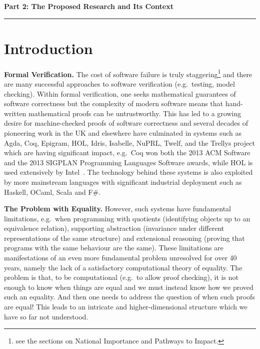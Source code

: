 \documentclass[a4paper,11pt]{article}
\newcommand{\eg}{{e.g.}\ }
\begin{document}
\newpage
\noindent
{\bf \Large Part 2: The Proposed Research and Its Context}

\vspace*{-0.23in}

\begin{center}
\rule{170mm}{.5mm}
\end{center}

\vspace*{-0.4in}

\section{Introduction}\label{sec:intro}

\vspace*{-0.1in}

{\bf Formal Verification.} The cost of software failure is truly
staggering\footnote{see the sections on National Importance and
  Pathways to Impact.} and there are many successful approaches to
software verification (\eg testing, model checking). Within formal
verification, one seeks mathematical guarantees of software correctness but
the complexity of modern software means that hand-written mathematical
proofs can be untrustworthy. This has led to a growing desire for
machine-checked proofs of software correctness and several decades of
pioneering work in the UK and elsewhere have culminated in systems
such as Agda, Coq, Epigram, HOL, Idris, Isabelle, NuPRL, Twelf, and
the Trellys project which are having significant impact, \eg Coq won
both the 2013 ACM Software and the 2013 SIGPLAN Programming Languages
Software awards, while HOL is used extensively by
Intel~\cite{harrison:sfm}. The technology behind these systems is also
exploited by more mainstream languages with significant industrial
deployment such as Haskell, OCaml, Scala and F\#.


{\bf The Problem with Equality.} However, such systems have
fundamental limitations, \eg when programming with quotients
(identifying objects up to an equivalence relation), supporting
abstraction (invariance under different representations of the same
structure) and extensional reasoning (proving that programs with the
same behaviour are the same). These limitations are manifestations of
an even more fundamental problem unresolved for over 40 years, namely
the lack of a satisfactory computational theory of equality. The
problem is that, to be computational (\eg to allow proof checking), it
is not enough to know when things are equal and we must instead know
how we proved such an equality. And then one needs to address the
question of when such proofs are equal! This leads to an intricate
and higher-dimensional structure which we have so far not understood.
\end{document}
